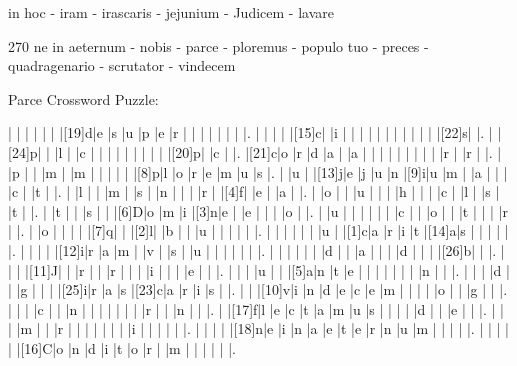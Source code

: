 \documentclass[12pt]{article}
\begin{document}
\pagestyle{fancy}
\fancyhf{}
\renewcommand{\headrulewidth}{0pt}
\renewcommand{\footrulewidth}{0pt}
\libertine
\renewcommand\PuzzleClueFont{\rm\normalsize}
\noindent\begin{rotate}{0}
\small
in hoc - iram - irascaris - jejunium - Judicem - lavare
\end{rotate}
\hfill
\begin{rotate}{270}
\small
ne in aeternum - nobis - parce - ploremus - populo tuo - preces - quadragenario - scrutator - vindecem
\end{rotate}
\begin{center}
  \huge{Parce Crossword Puzzle:}
\end{center}
\vspace{1.5cm}
\begin{Puzzle}{22}{24}
  |{}  |{}  |{}  |{}  |{}  |{}  |[19]d|e   |s   |u   |p   |e   |r   |{}  |{}  |{}  |{}  |{}  |{}  |{}  |.
  |{}  |{}  |{}  |{}  |[15]c|{}  |i   |{}  |{}  |{}  |{}  |{}  |{}  |{}  |{}  |{}  |{}  |{}  |[22]s|{}  |.
  |{}  |[24]p|{}  |{}  |l   |{}  |c   |{}  |{}  |{}  |{}  |{}  |{}  |{}  |{}  |{}  |[20]p|{}  |c   |{}  |.
  |[21]c|o   |r   |d   |a   |{}  |a   |{}  |{}  |{}  |{}  |{}  |{}  |{}  |{}  |{}  |r   |{}  |r   |{}  |.
  |{}  |p   |{}  |{}  |m   |{}  |m   |{}  |{}  |{}  |{}  |{}  |[8]p|l   |o   |r   |e   |m   |u   |s   |.
  |{}  |u   |{}  |[13]j|e   |j   |u   |n   |[9]i|u   |m   |{}  |a   |{}  |{}  |{}  |c   |{}  |t   |{}  |.
  |{}  |l   |{}  |{}  |m   |{}  |s   |{}  |n   |{}  |{}  |{}  |r   |{}  |[4]f|{}  |e   |{}  |a   |{}  |.
  |{}  |o   |{}  |{}  |u   |{}  |{}  |{}  |h   |{}  |{}  |{}  |c   |{}  |l   |{}  |s   |{}  |t   |{}  |.
  |{}  |t   |{}  |{}  |s   |{}  |{}  |[6]D|o   |m   |i   |[3]n|e   |{}  |e   |{}  |{}  |{}  |o   |{}  |.
  |{}  |u   |{}  |{}  |{}  |{}  |{}  |{}  |c   |{}  |{}  |o   |{}  |{}  |t   |{}  |{}  |{}  |r   |{}  |.
  |{}  |o   |{}  |{}  |{}  |{}  |[7]q|{}  |{}  |[2]l|{}  |b   |{}  |{}  |u   |{}  |{}  |{}  |{}  |{}  |.
  |{}  |{}  |{}  |{}  |{}  |{}  |u   |{}  |[1]c|a   |r   |i   |t   |[14]a|s   |{}  |{}  |{}  |{}  |{}  |.
  |{}  |{}  |{}  |{}  |[12]i|r   |a   |m   |{}  |v   |{}  |s   |{}  |u   |{}  |{}  |{}  |{}  |{}  |{}  |.
  |{}  |{}  |{}  |{}  |{}  |{}  |d   |{}  |{}  |a   |{}  |{}  |{}  |d   |{}  |{}  |{}  |[26]b|{}  |{}  |.
  |{}  |{}  |{}  |[11]J|{}  |{}  |r   |{}  |{}  |r   |{}  |{}  |{}  |i   |{}  |{}  |{}  |e   |{}  |{}  |.
  |{}  |{}  |{}  |u   |{}  |{}  |[5]a|n   |t   |e   |{}  |{}  |{}  |{}  |{}  |{}  |{}  |n   |{}  |{}  |.
  |{}  |{}  |{}  |d   |{}  |{}  |g   |{}  |{}  |{}  |[25]i|r   |a   |s   |[23]c|a   |r   |i   |s   |{}  |.
  |{}  |{}  |[10]v|i   |n   |d   |e   |c   |e   |m   |{}  |{}  |{}  |{}  |o   |{}  |{}  |g   |{}  |{}  |.
  |{}  |{}  |{}  |c   |{}  |{}  |n   |{}  |{}  |{}  |{}  |{}  |{}  |{}  |r   |{}  |{}  |n   |{}  |{}  |.
  |{}  |[17]f|l   |e   |c   |t   |a   |m   |u   |s   |{}  |{}  |{}  |{}  |d   |{}  |{}  |e   |{}  |{}  |.
  |{}  |{}  |{}  |m   |{}  |{}  |r   |{}  |{}  |{}  |{}  |{}  |{}  |{}  |i   |{}  |{}  |{}  |{}  |{}  |.
  |{}  |{}  |{}  |{}  |[18]n|e   |i   |n   |a   |e   |t   |e   |r   |n   |u   |m   |{}  |{}  |{}  |{}  |.
  |{}  |{}  |{}  |{}  |{}  |[16]C|o   |n   |d   |i   |t   |o   |r   |{}  |m   |{}  |{}  |{}  |{}  |{}  |.
\end{Puzzle}
\end{document}
